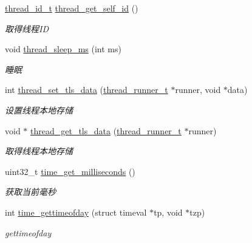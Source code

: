 \begin{DoxyCompactItemize}
\hyperlink{a00050_ad0ada5642d10ce71bdd90816182f9b79_ad0ada5642d10ce71bdd90816182f9b79}{thread\+\_\+id\+\_\+t} \hyperlink{a00107_gaecf10907eee00ec0e807271c906a6645_gaecf10907eee00ec0e807271c906a6645}{thread\+\_\+get\+\_\+self\+\_\+id} ()
\begin{DoxyCompactList}\small\item\em 取得线程\+I\+D \end{DoxyCompactList}\item 
void \hyperlink{a00107_gabddf3ac30aac3f22f8c53b7517e6eb35_gabddf3ac30aac3f22f8c53b7517e6eb35}{thread\+\_\+sleep\+\_\+ms} (int ms)
\begin{DoxyCompactList}\small\item\em 睡眠 \end{DoxyCompactList}\item 
int \hyperlink{a00107_gaa187b2cd2c906680890fb4ea2833d665_gaa187b2cd2c906680890fb4ea2833d665}{thread\+\_\+set\+\_\+tls\+\_\+data} (\hyperlink{a00050_a9054159cde2f926ef61c28ce1e555199_a9054159cde2f926ef61c28ce1e555199}{thread\+\_\+runner\+\_\+t} $\ast$runner, void $\ast$data)
\begin{DoxyCompactList}\small\item\em 设置线程本地存储 \end{DoxyCompactList}\item 
void $\ast$ \hyperlink{a00107_ga63c9be5b8fb04c0b26382f51b7bdf237_ga63c9be5b8fb04c0b26382f51b7bdf237}{thread\+\_\+get\+\_\+tls\+\_\+data} (\hyperlink{a00050_a9054159cde2f926ef61c28ce1e555199_a9054159cde2f926ef61c28ce1e555199}{thread\+\_\+runner\+\_\+t} $\ast$runner)
\begin{DoxyCompactList}\small\item\em 取得线程本地存储 \end{DoxyCompactList}\item 
uint32\+\_\+t \hyperlink{a00081_a528d27a7218cb2fdabf81ca343e24fc9_a528d27a7218cb2fdabf81ca343e24fc9}{time\+\_\+get\+\_\+milliseconds} ()
\begin{DoxyCompactList}\small\item\em 获取当前毫秒 \end{DoxyCompactList}\item 
int \hyperlink{a00081_a3cab12b4908938ca999206a67c8ee032_a3cab12b4908938ca999206a67c8ee032}{time\+\_\+gettimeofday} (struct timeval $\ast$tp, void $\ast$tzp)
\begin{DoxyCompactList}\small\item\em gettimeofday \end{DoxyCompactList}\item 

\end{DoxyCompactItemize}
